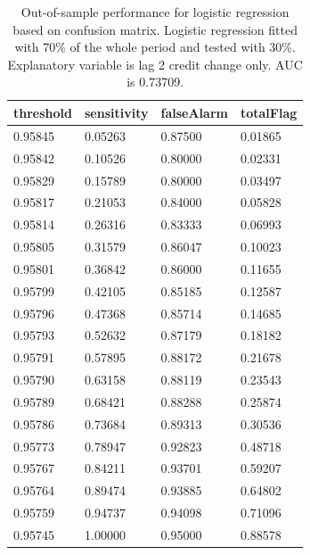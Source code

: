 \documentclass{article}
\begin{document}
\begin{multicols}{2}
\begin{table}[H]
        \caption{Out-of-sample performance for logistic regression based on confusion matrix.
        Logistic regression fitted with 70\% of the whole period and
        tested with 30\%. Explanatory variable is lag 2
        credit change only. AUC is 0.73709.}
        \begin{center}\begin{tabular}{|l|l|l|l|}
        \hline
         threshold         & sensitivity        & falseAlarm         & totalFlag            \\ \hline
        0.95845 & 0.05263 & 0.87500              & 0.01865 \\ \hline
        0.95842 & 0.10526 & 0.80000                & 0.02331 \\ \hline
        0.95829 & 0.15789 & 0.80000                & 0.03497  \\ \hline
        0.95817 & 0.21053 & 0.84000               & 0.05828  \\ \hline
        0.95814 & 0.26316  & 0.83333 & 0.06993  \\ \hline
        0.95805 & 0.31579  & 0.86047 & 0.10023  \\ \hline
        0.95801 & 0.36842  & 0.86000               & 0.11655  \\ \hline
        0.95799 & 0.42105 & 0.85185 & 0.12587   \\ \hline
        0.95796 & 0.47368 & 0.85714 & 0.14685  \\ \hline
        0.95793 & 0.52632  & 0.87179 & 0.18182  \\ \hline
        0.95791 & 0.57895  & 0.88172 & 0.21678  \\ \hline
        0.95790 & 0.63158   & 0.88119 & 0.23543  \\ \hline
        0.95789 & 0.68421  & 0.88288 & 0.25874  \\ \hline
        0.95786 & 0.73684  & 0.89313 & 0.30536  \\ \hline
        0.95773 & 0.78947  & 0.92823 & 0.48718  \\ \hline
        0.95767 & 0.84211  & 0.93701  & 0.59207   \\ \hline
        0.95764   & 0.89474  & 0.93885 & 0.64802   \\ \hline
        0.95759 & 0.94737  & 0.94098  & 0.71096    \\ \hline
        0.95745 & 1.00000                 & 0.95000               & 0.88578   \\ \hline
        \end{tabular}\end{center}
\end{table}


\end{multicols}
\end{document}
